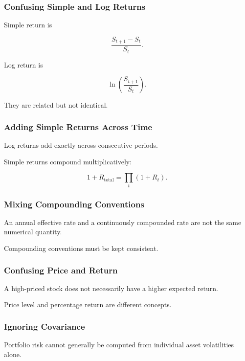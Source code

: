 \subsubsection{Confusing Simple and Log Returns}

Simple return is

\[
\frac{S_{t+1}-S_t}{S_t}.
\]

Log return is

\[
\ln
\left(
\frac{S_{t+1}}{S_t}
\right).
\]

They are related but not identical.

\subsubsection{Adding Simple Returns Across Time}

Log returns add exactly across consecutive periods.

Simple returns compound multiplicatively:

\[
\boxed{
1+R_{\mathrm{total}}
=
\prod_t(1+R_t).
}
\]

\subsubsection{Mixing Compounding Conventions}

An annual effective rate and a continuously compounded rate are not the same
numerical quantity.

Compounding conventions must be kept consistent.

\subsubsection{Confusing Price and Return}

A high-priced stock does not necessarily have a higher expected return.

Price level and percentage return are different concepts.

\subsubsection{Ignoring Covariance}

Portfolio risk cannot generally be computed from individual asset
volatilities alone.

